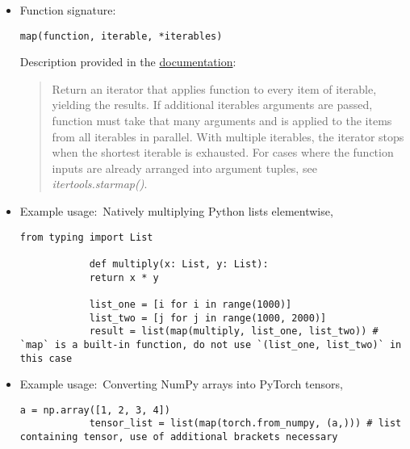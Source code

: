 \documentclass[12pt, a4paper]{article}
\numberwithin{equation}{section}
\theoremstyle{definition}
\theoremstyle{definition}
\begin{document}
	\begin{itemize}
		\item Function signature:
		
		\begin{lstlisting}[style=mystylepython, label=alg:map__func_signa, xleftmargin=\parindent]
			map(function, iterable, *iterables)
		\end{lstlisting}
		
		Description provided in the \href{https://docs.python.org/3/library/functions.html#map}{documentation}:
		
		\begin{quote}
			Return an iterator that applies function to every item of iterable, yielding the results. If additional iterables arguments are passed, function must take that many arguments and is applied to the items from all iterables in parallel. With multiple iterables, the iterator stops when the shortest iterable is exhausted. For cases where the function inputs are already arranged into argument tuples, see \textit{itertools.starmap()}.
		\end{quote}		
		
		\item Example usage:~Natively multiplying Python lists elementwise,
		
		\begin{lstlisting}[style=mystylepython, label=alg:map__python_lists_elementwise, xleftmargin=\parindent]
			from typing import List
			
			def multiply(x: List, y: List):
			return x * y
			
			list_one = [i for i in range(1000)]
			list_two = [j for j in range(1000, 2000)]
			result = list(map(multiply, list_one, list_two)) # `map` is a built-in function, do not use `(list_one, list_two)` in this case
		\end{lstlisting}
		
		\item Example usage:~Converting NumPy arrays into PyTorch tensors,
		
		\begin{lstlisting}[style=mystylepython, label=alg:map__numpy_torch_conv, xleftmargin=\parindent]
			a = np.array([1, 2, 3, 4])
			tensor_list = list(map(torch.from_numpy, (a,))) # list containing tensor, use of additional brackets necessary
		\end{lstlisting}
		
	\end{itemize}
	
	\newpage 
	
\end{document}
